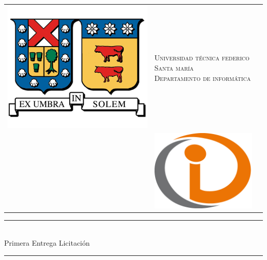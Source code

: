 \documentclass[paper=letter, fontsize=11pt]{scrartcl} %
\author{Ignacio Ampuero S. 201473032-2\\ Anghelo Carvajal C. 201473062-4\\Eduardo Pozo V. 201473040-3}
\date{\normalsize\today} %
\numberwithin{equation}{section} %
\numberwithin{figure}{section} %
\numberwithin{table}{section} %
\newcommand{\horrule}[1]{\rule{\linewidth}{#1}} %
\begin{document}
\begin{center}
  \setlength{\tabcolsep}{0pt}
  \begin{tabular}{>{\raggedleft}m{2.5cm}>{\centering}m{\dimexpr\textwidth - 5cm\relax}>{\raggedright}m{2.5cm}}
  \includegraphics[width=\linewidth]{logo}%
  &%
 \textsc{Universidad técnica federico Santa maría\\Departamento de informática} \\ [25pt] %
  &%
  \includegraphics[width=\linewidth]{di} %
  \end{tabular}
 
\normalfont \normalsize 
\horrule{0.5pt} \\[0.4cm] %
\huge Primera Entrega Licitación \\ %
\horrule{2pt} \\[0.5cm] %
\end{center}
\end{document}
